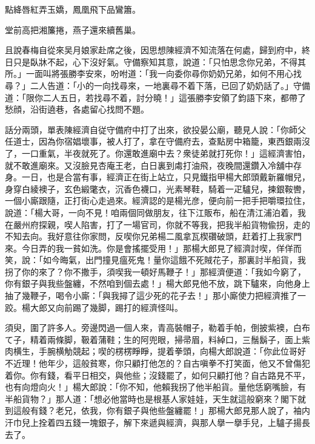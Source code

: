 \begin{myquote}
點絳唇紅弄玉嬌，鳳凰飛下品鸞簫。

堂前高把湘簾捲，燕子還來續舊巢。
\end{myquote}

且說春梅自從來吴月娘家赴席之後，因思想陳經濟不知流落在何處，歸到府中，終日只是臥牀不起，心下沒好氣。守備察知其意，說道：「只怕思念你兄弟，不得其所。」一面叫將張勝李安來，吩咐道：「我一向委你尋你奶奶兄弟，如何不用心找尋？」二人告道：「小的一向找尋來，一地裏尋不着下落，已回了奶奶話了。」守備道：「限你二人五日，若找尋不着，討分曉！」這張勝李安領了鈞語下來，都帶了愁顔，沿街遶巷，各處留心找問不題。

話分兩頭，單表陳經濟自従守備府中打了出來，欲投晏公廟，聽見人說：「你師父任道士，因為你宿娼壞事，被人打了，拿在守備府去，查點房中箱籠，東西銀兩沒了，一口重氣，半夜就死了。你還敢進廟中去？衆徒弟就打死你！」這經濟害怕，就不敢進廟來。又沒臉見杏庵王老，白日裏到䖏打油飛，夜晚間還鑽入冷舖中存身。一日，也是合當有事，經濟正在街上站立，只見鐵指甲楊大郎頭戴新羅帽兒，身穿白綾襖子，玄色緞氅衣，沉香色襪口，光素琴鞋，騎着一疋驢兒，揀銀鞍轡，一個小廝跟隨，正打街心走過來。經濟認的是楊光彦，便向前一把手把嚼環拉住，說道：「楊大哥，一向不見！咱兩個同做朋友，往下江販布，船在清江浦泊着，我在嚴州府探親，喫人陷害，打了一場官司，你就不等我，把我半船貨物偸拐，走的不知去向。我好意往你家問，反喫你兄弟楊二風拿瓦楔礸破頭，赶着打上我家門來。今日弄的我一貧如洗。你是會搖擺受用！」那楊大郎見了經濟討喫，佯佯而笑，說：「如今晦氣，出門撞見瘟死鬼！量你這餓不死賊花子，那裏討半船貨，我拐了你的來了？你不撒手，須喫我一頓好馬鞭子！」那經濟便道：「我如今窮了，你有銀子與我些盤纏，不然咱到個去處！」楊大郎見他不放，跳下驢來，向他身上抽了幾鞭子，喝令小廝：「與我撏了這少死的花子去！」那小廝使力把經濟推了一跤。楊大郎又向前踢了幾脚，踢打的經濟怪叫。

須臾，圍了許多人。旁邊閃過一個人來，青高裝帽子，勒着手帕，倒披紫襖，白布て子，精着兩條脚，靸着蒲鞋；生的阿兜眼，掃帚眉，料綽口，三鬚鬍子，面上紫肉横生，手腕横觔競起；喫的楞楞睜睜，提着拳頭，向楊大郎說道：「你此位哥好不近理！他年少，這般貧寒，你只顧打他怎的？自古嗔拳不打笑面，他又不曾傷犯着你。你有錢，看平日相交，與他些；沒錢罷了，如何只顧打他？自古路見不平，也有向燈向火！」楊大郎說：「你不知，他賴我拐了他半船貨。量他恁窮嘴臉，有半船貨物？」那人道：「想必他當時也是根基人家娃娃，天生就這般窮來？閣下就到這般有錢？老兄，依我，你有銀子與他些盤纏罷！」那楊大郎見那人說了，袖内汗巾兒上拴着四五錢一塊銀子，解下來遞與經濟，與那人擧一擧手兒，上驢子揚長去了。


